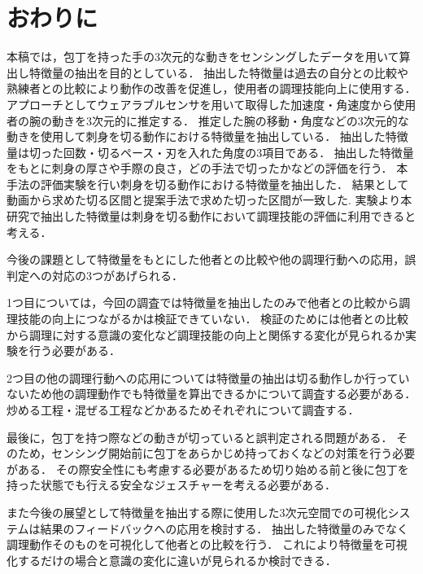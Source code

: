 \section{おわりに}

本稿では，包丁を持った手の3次元的な動きをセンシングしたデータを用いて算出し特徴量の抽出を目的としている．
抽出した特徴量は過去の自分との比較や熟練者との比較により動作の改善を促進し，使用者の調理技能向上に使用する．
アプローチとしてウェアラブルセンサを用いて取得した加速度・角速度から使用者の腕の動きを3次元的に推定する．
推定した腕の移動・角度などの3次元的な動きを使用して刺身を切る動作における特徴量を抽出している．
抽出した特徴量は切った回数・切るペース・刃を入れた角度の3項目である．
抽出した特徴量をもとに刺身の厚さや手際の良さ，どの手法で切ったかなどの評価を行う．
本手法の評価実験を行い刺身を切る動作における特徴量を抽出した．
結果として動画から求めた切る区間と提案手法で求めた切った区間が一致した.
実験より本研究で抽出した特徴量は刺身を切る動作において調理技能の評価に利用できると考える．

今後の課題として特徴量をもとにした他者との比較や他の調理行動への応用，誤判定への対応の3つがあげられる．

1つ目については，今回の調査では特徴量を抽出したのみで他者との比較から調理技能の向上につながるかは検証できていない．
検証のためには他者との比較から調理に対する意識の変化など調理技能の向上と関係する変化が見られるか実験を行う必要がある．

2つ目の他の調理行動への応用については特徴量の抽出は切る動作しか行っていないため他の調理動作でも特徴量を算出できるかについて調査する必要がある．
炒める工程・混ぜる工程などかあるためそれぞれについて調査する．

最後に，包丁を持つ際などの動きが切っていると誤判定される問題がある．
そのため，センシング開始前に包丁をあらかじめ持っておくなどの対策を行う必要がある．
その際安全性にも考慮する必要があるため切り始める前と後に包丁を持った状態でも行える安全なジェスチャーを考える必要がある．

また今後の展望として特徴量を抽出する際に使用した3次元空間での可視化システムは結果のフィードバックへの応用を検討する．
抽出した特徴量のみでなく調理動作そのものを可視化して他者との比較を行う．
これにより特徴量を可視化するだけの場合と意識の変化に違いが見られるか検討できる．